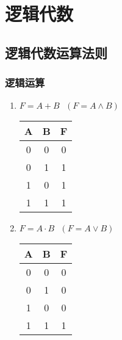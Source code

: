 \chapter{逻辑代数}
\newpage

\section{逻辑代数运算法则}

\subsection{逻辑运算}

\begin{enumerate}

    \item $F=A+B~~~(F=A\wedge B)$

          \begin{table}[!htbp]
              \begin{tabular}{|c|c|c|}
                  \hline
                  A & B & F \\
                  \hline
                  0 & 0 & 0 \\
                  \hline
                  0 & 1 & 1 \\
                  \hline
                  1 & 0 & 1 \\
                  \hline
                  1 & 1 & 1 \\
                  \hline
              \end{tabular}
          \end{table}

    \item $F=A\cdot B~~~(F=A\vee B)$

          \begin{table}[!htbp]
              \begin{tabular}{|c|c|c|}
                  \hline
                  A & B & F \\
                  \hline
                  0 & 0 & 0 \\
                  \hline
                  0 & 1 & 0 \\
                  \hline
                  1 & 0 & 0 \\
                  \hline
                  1 & 1 & 1 \\
                  \hline
              \end{tabular}
          \end{table}


\end{enumerate}
